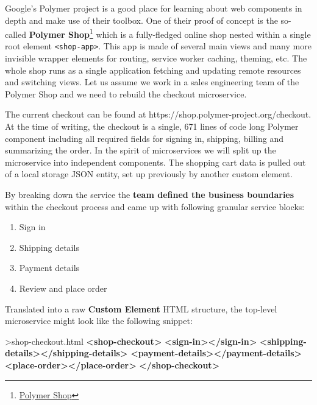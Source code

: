 \documentclass[]{article}
\newenvironment{Shaded}{}{}
\newcommand{\KeywordTok}[1]{\textcolor[rgb]{0.00,0.44,0.13}{\textbf{{#1}}}}
\newcommand{\NormalTok}[1]{{#1}}
\providecommand{\tightlist}{%
  \setlength{\itemsep}{0pt}\setlength{\parskip}{0pt}}
\begin{document}
Google's Polymer project is a good place for learning about web
components in depth and make use of their toolbox. One of their proof of
concept is the so-called \textbf{Polymer Shop}\footnote{\href{https://shop.polymer-project.org/}{Polymer
  Shop}} which is a fully-fledged online shop nested within a single
root element \texttt{\textless{}shop-app\textgreater{}}. This app is
made of several main views and many more invisible wrapper elements for
routing, service worker caching, theming, etc. The whole shop runs as a
single application fetching and updating remote resources and switching
views. Let us assume we work in a sales engineering team of the Polymer
Shop and we need to rebuild the checkout microservice.

The current checkout can be found at
https://shop.polymer-project.org/checkout. At the time of writing, the
checkout is a single, 671 lines of code long Polymer component including
all required fields for signing in, shipping, billing and summarizing
the order. In the spirit of microservices we will split up the
microservice into independent components. The shopping cart data is
pulled out of a local storage JSON entity, set up previously by another
custom element.

By breaking down the service the \textbf{team defined the business
boundaries} within the checkout process and came up with following
granular service blocks:

\begin{enumerate}
\def\labelenumi{\arabic{enumi}.}
\tightlist
\item
  Sign in
\item
  Shipping details
\item
  Payment details
\item
  Review and place order
\end{enumerate}

Translated into a raw \textbf{Custom Element} HTML structure, the
top-level microservice might look like the following snippet:

\begin{Shaded}
\begin{Highlighting}[]
\NormalTok{>shop-checkout.html}
\KeywordTok{<shop-checkout>}
  \KeywordTok{<sign-in></sign-in>}
  \KeywordTok{<shipping-details></shipping-details>}
  \KeywordTok{<payment-details></payment-details>}
  \KeywordTok{<place-order></place-order>}
\KeywordTok{</shop-checkout>}
\end{Highlighting}
\end{Shaded}
\end{document}
